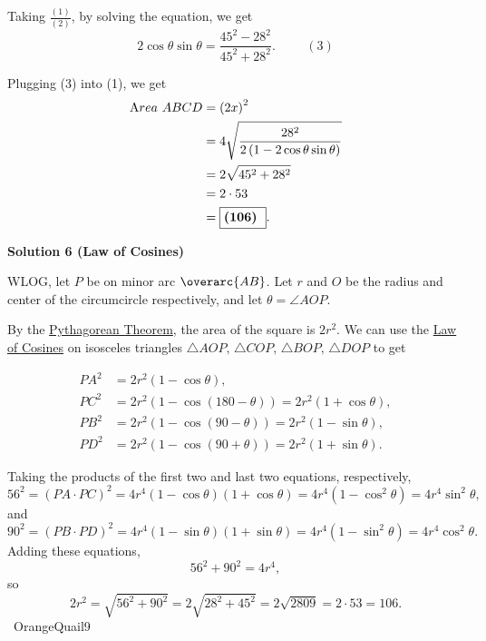 \begin{enumerate}
 Taking $\frac{(1)}{(2)}$, by solving the equation, we get
 \[ 2 \cos \theta \sin \theta = \frac{45^2 - 28^2}{45^2 + 28^2} . \hspace{1cm} (3) \]

 Plugging (3) into (1), we get
 \begin{align*} {\textrm Area} \ ABCD & = \left( 2 x \right)^2 \\ & = 4 \sqrt{\frac{28^2}{2 \left( 1 - 2 \cos \theta \sin \theta \right)}} \\ & = 2 \sqrt{45^2 + 28^2} \\ & = 2 \cdot 53 \\ & = \boxed{\textbf{(106) }} . \end{align*}





\textbf{Solution 6 (Law of Cosines)}

WLOG, let $P$ be on minor arc $\overarc {AB}$. Let $r$ and $O$ be the radius and center of the circumcircle respectively, and let $\theta = \angle AOP$.  	

 By the \href{https://artofproblemsolving.com/wiki/index.php?title=Pythagorean\_Theorem}{Pythagorean Theorem}, the area of the square is $2r^2$. We can use the \href{https://artofproblemsolving.com/wiki/index.php?title=Law\_of\_Cosines}{Law of Cosines} on isosceles triangles $\triangle AOP, \, \triangle COP, \, \triangle BOP, \, \triangle DOP$ to get 

 
 \begin{align*} 	 PA^2 &= 2r^2(1 - \cos \theta), \\	 PC^2 &= 2r^2(1 - \cos (180  - \theta)) = 2r^2(1 + \cos \theta), \\	 PB^2 &= 2r^2(1 - \cos (90 - \theta)) = 2r^2(1 - \sin \theta), \\	 PD^2 &= 2r^2(1 - \cos (90 + \theta)) = 2r^2(1 + \sin \theta).	 \end{align*}


 Taking the products of the first two and last two equations, respectively, 
 \[56^2 = (PA \cdot PC)^2 = 4r^4(1 - \cos \theta)(1 + \cos \theta) = 4r^4(1 - \cos^2 \theta) = 4r^4 \sin^2 \theta,\] and 
 \[90^2 = (PB \cdot PD)^2 = 4r^4(1 - \sin \theta)(1 + \sin \theta) = 4r^4(1 - \sin^2 \theta) = 4r^4 \cos^2 \theta.\]	Adding these equations, 
 \[56^2 + 90^2 = 4r^4,\] so  	
 \[2r^2 = \sqrt{56^2+90^2} = 2\sqrt{28^2+45^2} = 2\sqrt{2809} = 2 \cdot 53 = \boxed{106}.\]	~OrangeQuail9

 




\end{enumerate}
